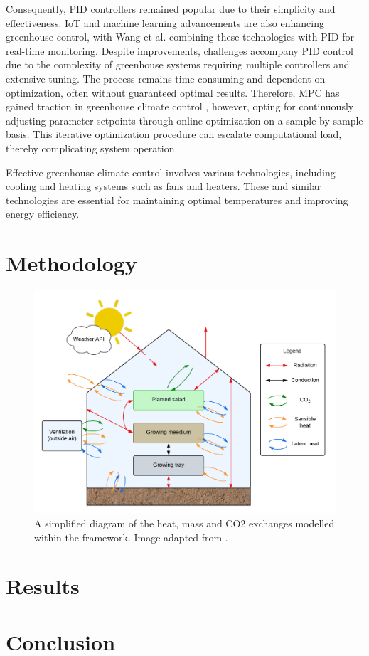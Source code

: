 \documentclass[conference]{IEEEtran}
\begin{document}
Consequently, PID controllers remained popular due to their simplicity and effectiveness. IoT and machine learning advancements are also enhancing greenhouse control, with Wang et al. \cite{Wang2024} combining these technologies with PID for real-time monitoring. Despite improvements, challenges accompany PID control due to the complexity of greenhouse systems requiring multiple controllers and extensive tuning. The process remains time-consuming and dependent on optimization, often without guaranteed optimal results. Therefore, MPC has gained traction in greenhouse climate control \cite{Hu2022}, however, opting for continuously adjusting parameter setpoints through online optimization on a sample-by-sample basis. This iterative optimization procedure can escalate computational load, thereby complicating system operation. 


Effective greenhouse climate control involves various technologies, including cooling and heating systems such as fans and heaters. These and similar technologies are essential for maintaining optimal temperatures and improving energy efficiency.



\section{Methodology}

\begin{figure}
    \centering
    \includegraphics[width=.5\textwidth]{images/diagram.pdf}
    \caption{A simplified diagram of the heat, mass and CO2 exchanges modelled within the framework. Image adapted from \cite{rmward61_2019}.}
    \label{fig:diagram}
\end{figure}

\section{Results}

\section{Conclusion}



\end{document}

